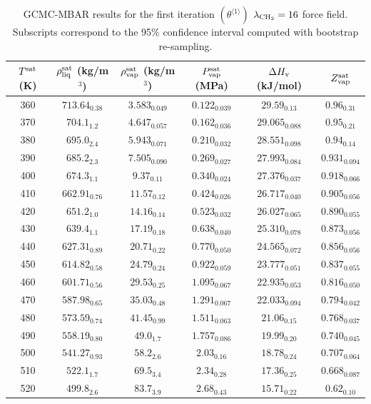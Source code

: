 \documentclass[journal=jctc,manuscript=article]{achemso}
\begin{document}
	\begin{table}[htb!]
		\caption{GCMC-MBAR results for the first iteration $(\theta^{\langle1\rangle})$ $\lambda_{\rm CH_2} = 16$ force field. Subscripts correspond to the 95\% confidence interval computed with bootstrap re-sampling.}
		\begin{center}
			\begin{tabular}{|c|c|c|c|c|c|}
				\hline
				$T^{\rm sat}$ (K) & $\rho_{\rm liq}^{\rm sat}$ (kg/m$^3$) & $\rho_{\rm vap}^{\rm sat}$ (kg/m$^3$) & $P_{\rm vap}^{\rm sat}$ (MPa) & $\Delta H_{\rm v}$ (kJ/mol) & $Z_{\rm vap}^{\rm sat}$ \\ \hline
				360 & $713.64_{0.38}$ & $3.583_{0.049}$ & $0.122_{0.039}$ & $29.59_{0.13}$ & $0.96_{0.31}$ \\
				370 & $704.1_{1.2}$ & $4.647_{0.057}$ & $0.162_{0.036}$ & $29.065_{0.088}$ & $0.95_{0.21}$ \\
				380 & $695.0_{2.4}$ & $5.943_{0.071}$ & $0.210_{0.032}$ & $28.551_{0.098}$ & $0.94_{0.14}$ \\
				390 & $685.2_{2.3}$ & $7.505_{0.090}$ & $0.269_{0.027}$ & $27.993_{0.084}$ & $0.931_{0.094}$ \\
				400 & $674.3_{1.1}$ & $9.37_{0.11}$ & $0.340_{0.024}$ & $27.376_{0.037}$ & $0.918_{0.066}$ \\
				410 & $662.91_{0.76}$ & $11.57_{0.12}$ & $0.424_{0.026}$ & $26.717_{0.040}$ & $0.905_{0.056}$ \\
				420 & $651.2_{1.0}$ & $14.16_{0.14}$ & $0.523_{0.032}$ & $26.027_{0.065}$ & $0.890_{0.055}$ \\
				430 & $639.4_{1.1}$ & $17.19_{0.18}$ & $0.638_{0.040}$ & $25.310_{0.078}$ & $0.873_{0.056}$ \\
				440 & $627.31_{0.89}$ & $20.71_{0.22}$ & $0.770_{0.050}$ & $24.565_{0.072}$ & $0.856_{0.056}$ \\
				450 & $614.82_{0.58}$ & $24.79_{0.24}$ & $0.922_{0.059}$ & $23.777_{0.051}$ & $0.837_{0.055}$ \\
				460 & $601.71_{0.56}$ & $29.53_{0.25}$ & $1.095_{0.067}$ & $22.935_{0.053}$ & $0.816_{0.050}$ \\
				470 & $587.98_{0.65}$ & $35.03_{0.48}$ & $1.291_{0.067}$ & $22.033_{0.094}$ & $0.794_{0.042}$ \\
				480 & $573.59_{0.74}$ & $41.45_{0.99}$ & $1.511_{0.063}$ & $21.06_{0.15}$ & $0.768_{0.037}$ \\
				490 & $558.19_{0.80}$ & $49.0_{1.7}$ & $1.757_{0.086}$ & $19.99_{0.20}$ & $0.740_{0.045}$ \\
				500 & $541.27_{0.93}$ & $58.2_{2.6}$ & $2.03_{0.16}$ & $18.78_{0.24}$ & $0.707_{0.064}$ \\
				510 & $522.1_{1.7}$ & $69.5_{3.4}$ & $2.34_{0.28}$ & $17.36_{0.25}$ & $0.668_{0.087}$ \\
				520 & $499.8_{2.6}$ & $83.7_{3.9}$ & $2.68_{0.43}$ & $15.71_{0.22}$ & $0.62_{0.10}$ \\
				\hline
			\end{tabular}
		\end{center}
	\end{table}
\end{document}

